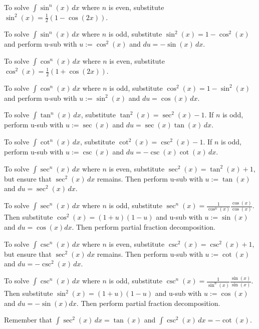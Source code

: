 
\begin{procedure} \ \\
  To solve $\int \sin^n(x) \,dx$ where $n$ is even, substitute $\sin^2 (x) = \tfrac{1}{2} (1 - \cos(2x))$.

  To solve $\int \sin^n(x) \,dx$ where $n$ is odd, substitute $\sin^2 (x) = 1 - \cos^2 (x)$ and perform u-sub with $u := \cos^2 (x)$ and $du = -\sin(x) \,dx$.

  To solve $\int \cos^n(x) \,dx$ where $n$ is even, substitute $\cos^2 (x) = \tfrac{1}{2} (1 + \cos(2x))$.

  To solve $\int \cos^n(x) \,dx$ where $n$ is odd, substitute $\cos^2 (x) = 1 - \sin^2 (x)$ and perform u-sub with $u := \sin^2 (x)$ and $du = \cos(x) \,dx$.

  To solve $\int \tan^n(x) \,dx$, substitute $\tan^2 (x) = \sec^2 (x) - 1$. If $n$ is odd, perform u-sub with $u := \sec(x)$ and $du = \sec(x)\tan(x)\,dx$.

  To solve $\int \cot^n(x) \,dx$, substitute $\cot^2 (x) = \csc^2 (x) - 1$. If $n$ is odd, perform u-sub with $u := \csc(x)$ and $du = -\csc(x)\cot(x)\,dx$.

  To solve $\int \sec^n(x) \,dx$ where $n$ is even, substitute $\sec^2(x) = \tan^2(x) + 1$, but ensure that $\sec^2(x)\,dx$ remains. Then perform u-sub with $u := \tan(x)$ and $du = \sec^2(x)\,dx$.

  To solve $\int \sec^n(x) \,dx$ where $n$ is odd, substitute $\sec^n(x) = \frac{1}{\cos^n(x)} \frac{\cos(x)}{\cos(x)}$. Then substitute $\cos^2(x) = (1 + u)(1 - u)$ and u-sub with $u := \sin(x)$ and $du = \cos(x) dx$. Then perform partial fraction decomposition.

  To solve $\int \csc^n(x) \,dx$ where $n$ is even, substitute $\csc^2(x) = \csc^2(x) + 1$, but ensure that $\sec^2(x)\,dx$ remains. Then perform u-sub with $u := \cot(x)$ and $du = -\csc^2(x)\,dx$.

  To solve $\int \csc^n(x) \,dx$ where $n$ is odd, substitute $\csc^n(x) = \frac{1}{\sin^n(x)} \frac{\sin(x)}{\sin(x)}$. Then substitute $\sin^2(x) = (1 + u)(1 - u)$ and u-sub with $u := \cos(x)$ and $du = -\sin(x) dx$. Then perform partial fraction decomposition.

  Remember that $\int \sec^2(x) \,dx = \tan(x)$ and $\int \csc^2(x) \,dx = -\cot(x)$. 
\end{procedure}

